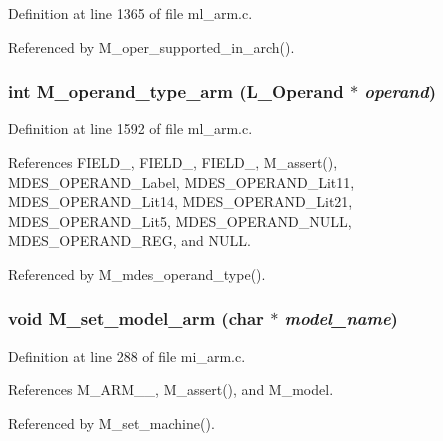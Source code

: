 Definition at line 1365 of file ml\_\-arm.c.

Referenced by M\_\-oper\_\-supported\_\-in\_\-arch().
\subsubsection{\setlength{\rightskip}{0pt plus 5cm}int M\_\-operand\_\-type\_\-arm (L\_\-Operand $\ast$ {\em operand})}\label{m__arm_8h_4ec85c5a7f35c3b9a3cf6075702bd71a}




Definition at line 1592 of file ml\_\-arm.c.

References FIELD\_, FIELD\_, FIELD\_, M\_\-assert(), MDES\_\-OPERAND\_\-Label, MDES\_\-OPERAND\_\-Lit11, MDES\_\-OPERAND\_\-Lit14, MDES\_\-OPERAND\_\-Lit21, MDES\_\-OPERAND\_\-Lit5, MDES\_\-OPERAND\_\-NULL, MDES\_\-OPERAND\_\-REG, and NULL.

Referenced by M\_\-mdes\_\-operand\_\-type().
\subsubsection{\setlength{\rightskip}{0pt plus 5cm}void M\_\-set\_\-model\_\-arm (char $\ast$ {\em model\_\-name})}\label{m__arm_8h_df66c76f9b00fb8b9b2a1d23994befee}




Definition at line 288 of file mi\_\-arm.c.

References M\_\-ARM\_\_, M\_\-assert(), and M\_\-model.

Referenced by M\_\-set\_\-machine().